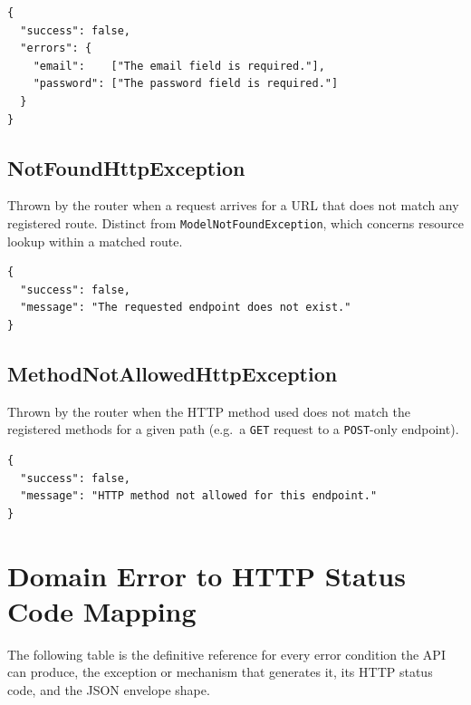 \begin{lstlisting}[style=json, caption={Rendered HTTP 422 response for a
  failed login validation.}]
{
  "success": false,
  "errors": {
    "email":    ["The email field is required."],
    "password": ["The password field is required."]
  }
}
\end{lstlisting}

\subsection{NotFoundHttpException}

Thrown by the router when a request arrives for a URL that does not
match any registered route. Distinct from \texttt{ModelNotFoundException},
which concerns resource lookup within a matched route.

\begin{lstlisting}[style=json, caption={Rendered HTTP 404 response for
  an unregistered route.}]
{
  "success": false,
  "message": "The requested endpoint does not exist."
}
\end{lstlisting}

\subsection{MethodNotAllowedHttpException}

Thrown by the router when the HTTP method used does not match the
registered methods for a given path (e.g.\ a \texttt{GET} request to
a \texttt{POST}-only endpoint).

\begin{lstlisting}[style=json, caption={Rendered HTTP 405 response.}]
{
  "success": false,
  "message": "HTTP method not allowed for this endpoint."
}
\end{lstlisting}

\section{Domain Error to HTTP Status Code Mapping}
\label{sec:error-status-map}

The following table is the definitive reference for every error condition
the API can produce, the exception or mechanism that generates it, its
HTTP status code, and the JSON envelope shape.

\renewcommand{\arraystretch}{1.45}

